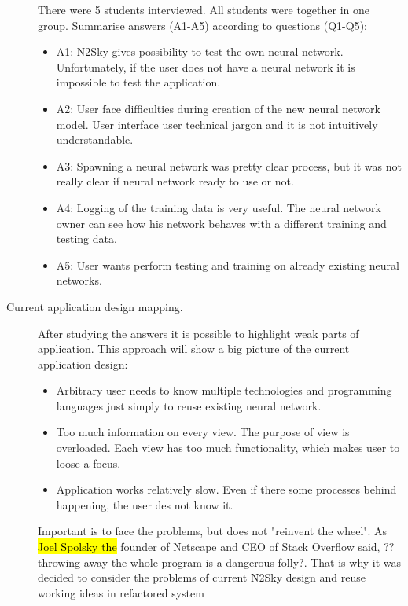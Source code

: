 \begin{description}
There were 5 students interviewed. All students were together in one group. Summarise answers (A1-A5) according to questions (Q1-Q5): 

\begin{itemize}
\item A1: N2Sky gives possibility to test the own neural network. Unfortunately, if the user does not have a neural network it is impossible to test the application.   
\item A2:  User face difficulties during creation of the new neural network model. User interface user technical jargon and it is not intuitively understandable.  
\item A3:  Spawning a neural network was pretty clear process, but it was not really clear if neural network ready to use or not.
\item A4:  Logging of the training data is very useful. The neural network owner can see how his network behaves with a different training and testing data.
\item A5:  User wants perform testing and training on already existing neural networks. 
\end{itemize}	


\item[Current application design mapping.]

After studying the answers it is possible to highlight weak parts of application. This approach will show a big picture of the current application design:

\begin{itemize}
\item Arbitrary user needs to know multiple technologies and programming languages just simply to reuse existing neural network. 
\item Too much information on every view. The purpose of view is overloaded. Each view has too much functionality, which makes user to loose a focus.
\item Application works relatively slow. Even if there some processes behind happening, the user des not know it.
\end{itemize}

Important is to face the problems, but does not "reinvent the wheel".  As \hl{Joel Spolsky the} founder of Netscape and CEO of Stack Overflow said, ??throwing away the whole program is a dangerous folly?. That is why it was decided to consider the problems of current N2Sky design and reuse working ideas in refactored system


\end{description}
